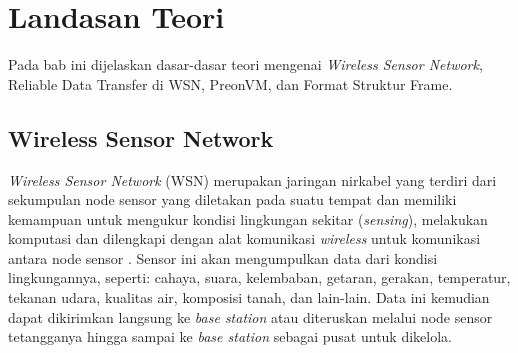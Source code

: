 \chapter{Landasan Teori}
\label{chap:teori}
Pada bab ini dijelaskan dasar-dasar teori mengenai \textit{Wireless Sensor Network}, Reliable Data Transfer di WSN, PreonVM, dan Format Struktur Frame.

\section{Wireless Sensor Network}
\label{sec:wsn}
\textit{Wireless Sensor Network} (WSN) merupakan jaringan nirkabel yang terdiri dari sekumpulan node sensor yang diletakan pada suatu tempat dan memiliki kemampuan untuk mengukur kondisi lingkungan sekitar (\textit{sensing}), melakukan komputasi dan dilengkapi dengan alat komunikasi \textit{wireless} untuk komunikasi antara node sensor \cite{fundamentals:0:fundamental} \cite{a_wireless_sensor}. Sensor ini akan mengumpulkan data dari kondisi lingkungannya, seperti: cahaya, suara, kelembaban, getaran, gerakan, temperatur, tekanan udara, kualitas air, komposisi tanah, dan lain-lain. Data ini kemudian dapat dikirimkan langsung ke \textit{base station} atau diteruskan melalui node sensor tetangganya hingga sampai ke \textit{base station} sebagai pusat untuk dikelola. 


